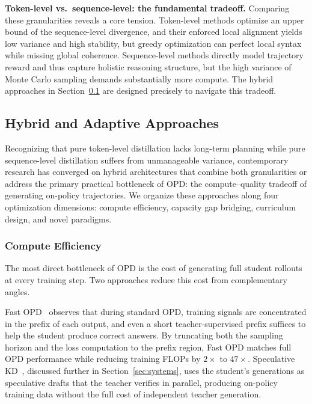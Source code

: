 \documentclass{article} %
\begin{document}
\textbf{Token-level vs.\ sequence-level: the fundamental tradeoff.}
Comparing these granularities reveals a core tension. Token-level methods optimize an upper bound of the sequence-level divergence, and their enforced local alignment yields low variance and high stability, but greedy optimization can perfect local syntax while missing global coherence. Sequence-level methods directly model trajectory reward and thus capture holistic reasoning structure, but the high variance of Monte Carlo sampling demands substantially more compute. The hybrid approaches in Section~\ref{subsec:hybrid} are designed precisely to navigate this tradeoff.

\subsection{Hybrid and Adaptive Approaches}
\label{subsec:hybrid}

Recognizing that pure token-level distillation lacks long-term planning while pure sequence-level distillation suffers from unmanageable variance, contemporary research has converged on hybrid architectures that combine both granularities or address the primary practical bottleneck of OPD: the compute--quality tradeoff of generating on-policy trajectories. We organize these approaches along four optimization dimensions: compute efficiency, capacity gap bridging, curriculum design, and novel paradigms.

\subsubsection{Compute Efficiency}

The most direct bottleneck of OPD is the cost of generating full student rollouts at every training step. Two approaches reduce this cost from complementary angles.

Fast OPD~\citep{2602.15260} observes that during standard OPD, training signals are concentrated in the prefix of each output, and even a short teacher-supervised prefix suffices to help the student produce correct answers. By truncating both the sampling horizon and the loss computation to the prefix region, Fast OPD matches full OPD performance while reducing training FLOPs by $2\times$ to $47\times$. Speculative KD~\citep{2410.11325}, discussed further in Section~\ref{sec:systems}, uses the student's generations as speculative drafts that the teacher verifies in parallel, producing on-policy training data without the full cost of independent teacher generation.
\end{document}
